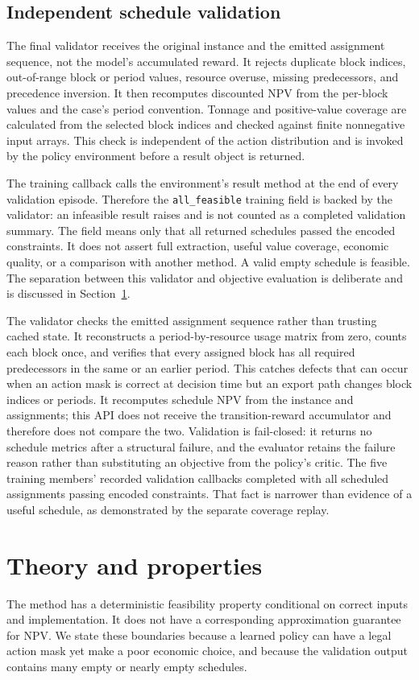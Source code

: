 \documentclass[11pt]{article}
\begin{document}
\subsection{Independent schedule validation}
The final validator receives the original instance and the emitted assignment sequence, not the model's accumulated reward. It rejects duplicate block indices, out-of-range block or period values, resource overuse, missing predecessors, and precedence inversion. It then recomputes discounted NPV from the per-block values and the case's period convention. Tonnage and positive-value coverage are calculated from the selected block indices and checked against finite nonnegative input arrays. This check is independent of the action distribution and is invoked by the policy environment before a result object is returned.

The training callback calls the environment's result method at the end of every validation episode. Therefore the \texttt{all\_feasible} training field is backed by the validator: an infeasible result raises and is not counted as a completed validation summary. The field means only that all returned schedules passed the encoded constraints. It does not assert full extraction, useful value coverage, economic quality, or a comparison with another method. A valid empty schedule is feasible. The separation between this validator and objective evaluation is deliberate and is discussed in Section~\ref{sec:theory}.

The validator checks the emitted assignment sequence rather than trusting cached state. It reconstructs a period-by-resource usage matrix from zero, counts each block once, and verifies that every assigned block has all required predecessors in the same or an earlier period. This catches defects that can occur when an action mask is correct at decision time but an export path changes block indices or periods. It recomputes schedule NPV from the instance and assignments; this API does not receive the transition-reward accumulator and therefore does not compare the two. Validation is fail-closed: it returns no schedule metrics after a structural failure, and the evaluator retains the failure reason rather than substituting an objective from the policy's critic. The five training members' recorded validation callbacks completed with all scheduled assignments passing encoded constraints. That fact is narrower than evidence of a useful schedule, as demonstrated by the separate coverage replay.

\section{Theory and properties}
\label{sec:theory}
The method has a deterministic feasibility property conditional on correct inputs and implementation. It does not have a corresponding approximation guarantee for NPV. We state these boundaries because a learned policy can have a legal action mask yet make a poor economic choice, and because the validation output contains many empty or nearly empty schedules.
\end{document}
